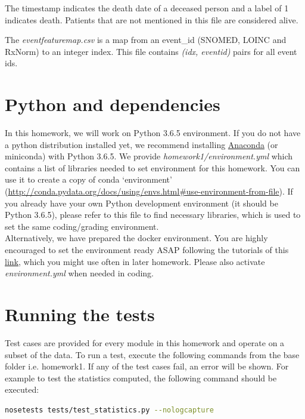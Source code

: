 \documentclass[12pt]{article}
\begin{document}
The timestamp indicates the death date of a deceased person and a label of 1 indicates death. Patients that are not mentioned in this file are considered alive.

The \textit{event\textunderscore feature\textunderscore map.csv} is a map from an event\_id (SNOMED, LOINC and RxNorm) to an integer index. This file contains \textit{(idx, event\textunderscore id)} pairs for all event ids.

\section*{Python and dependencies}
In this homework, we will work on Python 3.6.5 environment. If you do not have a python distribution installed yet, we recommend installing \href{https://docs.continuum.io/anaconda/install}{Anaconda} (or miniconda) with Python 3.6.5. We provide \textit{homework1/environment.yml} which contains a list of libraries needed to set environment
for this homework. You can use it to create a copy of conda `environment' (\href{http://conda.pydata.org/docs/using/envs.html#use-environment-from-file}{http://conda.pydata.org/docs/using/envs.html\#use-environment-from-file}). If you already have your own Python development environment (it should be Python 3.6.5), please refer to this file to find necessary libraries, which is used to set the same coding/grading environment. \\

\noindent Alternatively, we have prepared the docker environment. You are highly encouraged to set the environment ready ASAP following the tutorials of this \href{http://sunlab.org/teaching/cse6250/fall2018/env/#setup-virtual-environment}{link}, which you might use often in later homework. Please also activate \textit{environment.yml} when needed in coding.


\section*{Running the tests}
Test cases are provided for every module in this homework and operate on a subset of the data. To run a test, execute the following commands from the base folder i.e. homework1. If any of the test cases fail, an error will be shown. For example to test the statistics computed, the following command should be executed: \\

\begin{lstlisting}[frame=single, language=bash]
nosetests tests/test_statistics.py --nologcapture
\end{lstlisting}
\end{document}
